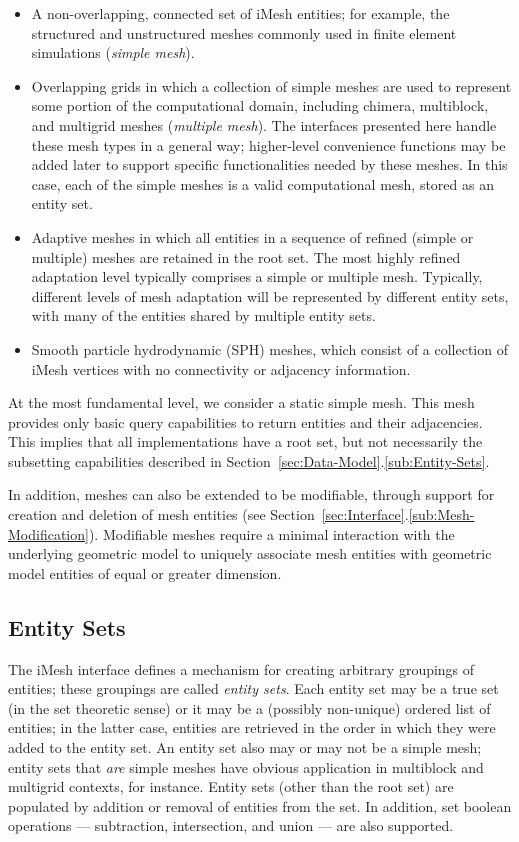 \begin{itemize}
\item A non-overlapping, connected set of iMesh entities; for example,
the structured and unstructured meshes commonly used in finite element
simulations (\emph{simple mesh}).  
\item Overlapping grids in which a collection of simple meshes are used
to represent some portion of the computational domain, including
chimera, multiblock, and multigrid meshes (\emph{multiple mesh}). The
interfaces presented here handle these mesh types in a general way;
higher-level convenience functions may be added later to support
specific functionalities needed by these meshes. In this case, each of
the simple meshes is a valid computational mesh, stored as an entity
set.
\item Adaptive meshes in which all entities in a sequence of refined (simple or multiple)
meshes are retained in the root set. The most highly refined adaptation
level typically comprises a simple or multiple mesh. Typically,
different levels of mesh adaptation will be represented by different entity
sets, with many of the entities shared by multiple entity sets.
\item Smooth particle hydrodynamic (SPH) meshes, which consist of a collection
of iMesh vertices with no connectivity or adjacency information. 
\end{itemize}
At the most fundamental level, we consider a static simple mesh. This
mesh provides only basic query capabilities to return entities and their
adjacencies.  This implies that all implementations have a root set, but
not necessarily the subsetting capabilities described in
Section~\ref{sec:Data-Model}.\ref{sub:Entity-Sets}.

In addition, meshes can also be extended to be modifiable, through
support for creation and deletion of mesh entities (see
Section~\ref{sec:Interface}.\ref{sub:Mesh-Modification}).  Modifiable
meshes require a minimal interaction with the underlying geometric model
to uniquely associate mesh entities with geometric model entities of
equal or greater dimension\cite{geoclas}.


\subsection{Entity Sets\label{sub:Entity-Sets}}

The iMesh interface defines a mechanism for creating arbitrary
groupings of entities; these groupings are called \emph{entity sets}.
Each entity set may be a true set (in the set theoretic sense) or it may be
a (possibly non-unique) ordered list of entities; in the latter case,
entities are retrieved in the order in which they were added to the
entity set. An entity set also may or may not be a simple mesh; entity
sets that \emph{are} simple meshes have obvious application in
multiblock and multigrid contexts, for instance. Entity sets (other than
the root set) are populated by addition or removal of entities from the
set. In addition, set boolean operations --- subtraction, intersection,
and union --- are also supported.


